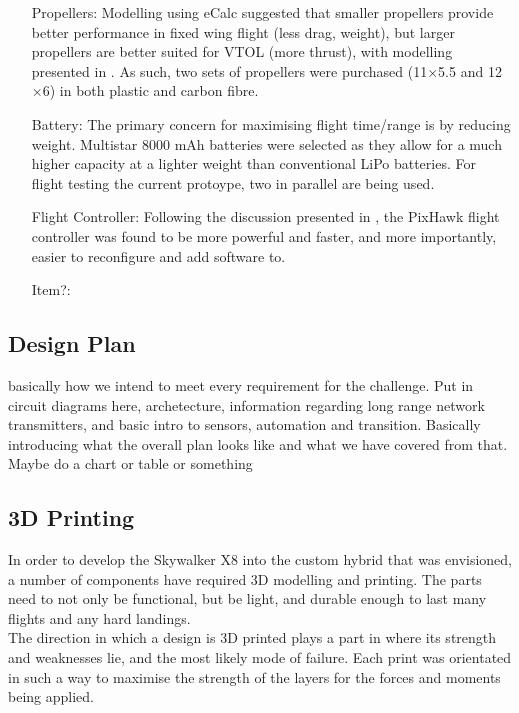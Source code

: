 \begin{itemize}
		\item[Propellers:] Modelling using eCalc suggested that smaller propellers provide better performance in fixed wing flight (less drag, weight), but larger propellers are better suited for VTOL (more thrust), with modelling presented in . As such, two sets of propellers were purchased (11$\times$5.5 and 12$\times$6) in both plastic and carbon fibre.
	
		\item[Battery:] The primary concern for maximising flight time/range is by reducing weight. Multistar 8000 mAh batteries were selected as they allow for a much higher capacity at a lighter weight than conventional LiPo batteries. For flight testing the current protoype, two in parallel are being used. 
	
		\item[Flight Controller:] Following the discussion presented in \cite{ref:controller_comparison}, the PixHawk flight controller was found to be more powerful and faster, and more importantly, easier to reconfigure and add software to.
		
	
		\item[Item?:]
	\end{itemize}
\subsection{Design Plan}
\color{red}
basically how we intend to meet every requirement for the challenge. Put in circuit diagrams here, archetecture, information regarding long range network transmitters, and basic intro to sensors, automation and transition. Basically introducing what the overall plan looks like and what we have covered from that. Maybe do a chart or table or something
\color{black}
\subsection{3D Printing}
In order to develop the Skywalker X8 into the custom hybrid that was envisioned, a number of components have required 3D modelling and printing. The parts need to not only be functional, but be light, and durable enough to last many flights and any hard landings.\\

The direction in which a design is 3D printed plays a part in where its strength and weaknesses lie, and the most likely mode of failure. Each print was orientated in such a way to maximise the strength of the layers for the forces and moments being applied.\\

